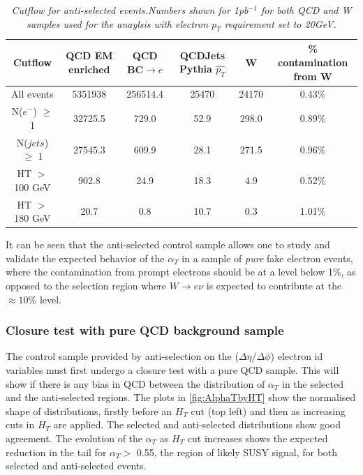 \begin{table}[h!]
\begin{center}
\begin{tabular}{|c||c|c|c|c|c|}
\hline
Cutflow & QCD EM enriched & QCD BC$\rightarrow e$ & QCDJets Pythia $\hat{p_{T}}$ &  W & \% contamination from W\\
\hline
All events & 5351938 & 256514.4 & 25470 & 24170 & 0.43\%\\
N($e^{-}$) $\geq$ 1 & 32725.5 & 729.0 & 52.9 & 298.0 & 0.89\%\\
N($jets$) $\geq$ 1 & 27545.3 & 609.9 & 28.1 & 271.5 & 0.96\%\\
HT $>$ 100 GeV & 902.8 & 24.9 & 18.3 & 4.9 & 0.52\%\\
HT $>$ 180 GeV & 20.7 & 0.8 & 10.7 & 0.3 & 1.01\%\\
\hline
\end{tabular}
\end{center}
\caption{\textit{Cutflow for anti-selected events.Numbers shown for 1pb$^{-1}$ for both QCD and W samples used for the anaylsis with electron $p_{T}$ requirement set to 20GeV.}}
\label{tab:CF_AS_20}
\end{table}

It can be seen that the anti-selected control sample allows one to study and validate the expected behavior of the $\alpha_{T}$ in a sample of \textit{pure} fake electron events, where the contamination from prompt electrons should be at a level below 1\%, as opposed to the selection region where $W \rightarrow e\nu$ is expected to contribute at the $\approx 10$\% level.

\subsubsection{Closure test with pure QCD background sample}

The control sample provided by anti-selection on the ($\Delta \eta$/$\Delta \phi$) electron id variables must first undergo a closure test with a pure QCD sample. This will show if there is any bias in QCD between the distribution of $\alpha_{T}$ in the selected and the anti-selected regions. The plots in \ref{fig:AlphaTbyHT} show the normalised shape of distributions, firstly before an $H_{T}$ cut (top left) and then as increasing cuts in $H_{T}$ are applied. The selected and anti-selected distributions show good agreement. The evolution of the $\alpha_{T}$ as $H_{T}$ cut increases shows the expected reduction in the tail for $\alpha_{T} >$ 0.55, the region of likely SUSY signal, for both selected and anti-selected events.

